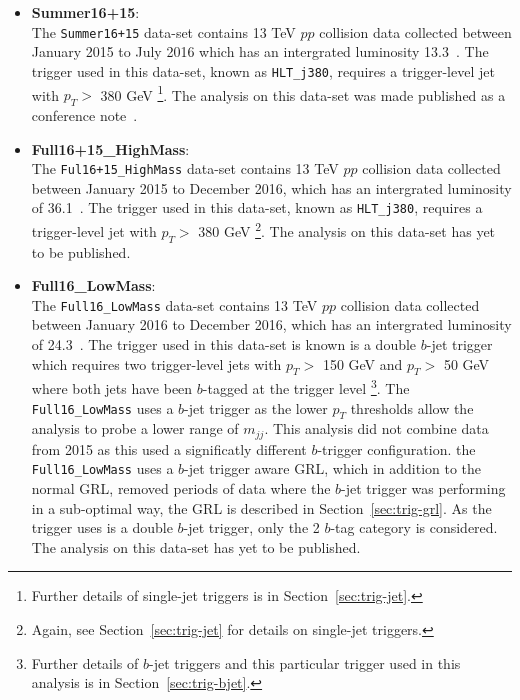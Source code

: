 \begin{itemize}[leftmargin=*]
\item\textbf{Summer16+15}: \\
  The \verb|Summer16+15| data-set contains 13 TeV $pp$ collision data collected
  between January 2015 to July 2016 which has an intergrated luminosity 13.3~\ifb.
  The trigger used in this data-set, known as \verb|HLT_j380|,
  requires a trigger-level jet with $p_T >$ 380 GeV
  \footnote{\label{foot1} Further details of single-jet triggers is in Section~\ref{sec:trig-jet}.}.
  The analysis on this data-set was made published as a conference note~\cite{dibjet-ichep_conf}. \\
  
\item\textbf{Full16+15\_HighMass}:\\
  The \verb|Ful16+15_HighMass| data-set contains 13 TeV $pp$ collision data collected
  between January 2015 to December 2016, which has an intergrated luminosity of 36.1~\ifb.
  The trigger used in this data-set, known as \verb|HLT_j380|,
  requires a trigger-level jet with $p_T >$ 380 GeV
  \footnote{Again, see  Section~\ref{sec:trig-jet} for details on single-jet triggers.}.
  The analysis on this data-set has yet to be published.\\
  
\item\textbf{Full16\_LowMass}: \\
  The \verb|Full16_LowMass| data-set contains 13 TeV $pp$ collision data collected
  between January 2016 to December 2016, which has an intergrated luminosity of 24.3~\ifb.
  The trigger used in this data-set is known is a double $b$-jet trigger 
  which requires two trigger-level jets with $p_T >$ 150 GeV and $p_T >$ 50 GeV
  where both jets have been $b$-tagged at the trigger level
  \footnote{Further details of $b$-jet triggers and this particular trigger used in this analysis is in Section~\ref{sec:trig-bjet}.}.
  The \verb|Full16_LowMass| uses a $b$-jet trigger as the lower $p_T$ thresholds allow
  the analysis to probe a lower range of $m_{jj}$.
  This analysis did not combine data from 2015 as this used a significatly different $b$-trigger configuration.
  the \verb|Full16_LowMass| uses a $b$-jet trigger aware GRL, which in addition to the normal GRL,
  removed periods of data where the $b$-jet trigger was performing in a sub-optimal way,
  the GRL is described in Section~\ref{sec:trig-grl}.
  As the trigger uses is a double $b$-jet trigger, only the 2 $b$-tag category is considered.
  The analysis on this data-set has yet to be published.

\end{itemize}

